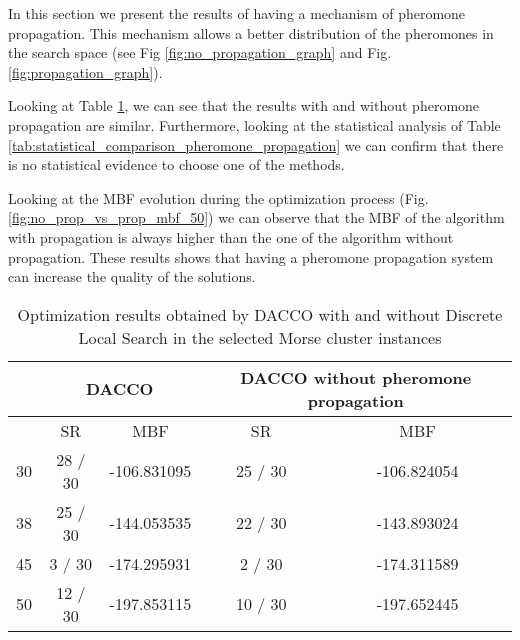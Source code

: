 		In this section we present the results of having a mechanism of pheromone propagation. This mechanism allows a better distribution of the pheromones in the search space (see Fig \ref{fig:no_propagation_graph} and Fig.\ref{fig:propagation_graph}).
		
		Looking at Table \ref{tab:pheromone_propagation_results}, we can see that the results with and without pheromone propagation are similar. Furthermore, looking at the statistical analysis of Table \ref{tab:statistical_comparison_pheromone_propagation} we can confirm that there is no statistical evidence to choose one of the methods. 
		
		Looking at the MBF evolution during the optimization process (Fig. \ref{fig:no_prop_vs_prop_mbf_50}) we can observe that the MBF of the algorithm with propagation is always higher than the one of the algorithm without propagation. These results shows that having a pheromone propagation system can increase the quality of the solutions.
		
		
		\pagebreak
		
		\begin{table}[!htdp]
				\begin{center}
					\begin{tabular}{| c | c | c | c | c |}
						\hline
						~ & \multicolumn{2}{c|}{\textbf{DACCO}} & \multicolumn{2}{p{4cm}|}{\textbf{DACCO without pheromone propagation}} \\ \hline
						~ & SR & MBF & SR & MBF \\ \hline
						30 & 28 / 30 & -106.831095 & 25 / 30 & -106.824054 \\ \hline
						38 & 25 / 30 & -144.053535 & 22 / 30 & -143.893024 \\ \hline
						45 & 3 / 30 & -174.295931 & 2 / 30 & -174.311589 \\ \hline
						50 & 12 / 30 & -197.853115 & 10 / 30 & -197.652445 \\ \hline
					\end{tabular}
					\caption{Optimization results obtained by DACCO with and without Discrete Local Search in the selected Morse cluster instances}
					\label{tab:pheromone_propagation_results}
				\end{center}
		\end{table}
		
